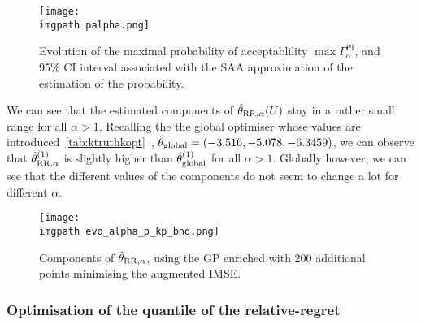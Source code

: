 \documentclass[../../Main_ManuscritThese.tex]{subfiles}
\newcommand\imgpath{/home/victor/acadwriting/Manuscrit/Text/Chapter5/img/}
\begin{document}
\begin{figure}[ht]
  \centering
  \texttt{[image: \\imgpath palpha.png]}
  \caption[Evolution of the maximal probability of
    acceptablility $\max \Gamma_{\alpha}^{\mathrm{PI}}$]{\label{fig:p_alpha} Evolution of the maximal probability of
    acceptablility $\max \Gamma_{\alpha}^{\mathrm{PI}}$, and 95\% CI
    interval associated with the SAA approximation of the estimation
    of the probability.}
\end{figure}

We can see that the estimated components of
$\hat{\theta}_{\mathrm{RR},\alpha}(U)$ stay in a rather small range for
all $\alpha >1$. Recalling the the global optimiser whose values are
introduced~\cref{tab:ktruthkopt}~,
$\hat{\theta}_{\mathrm{global}} = (-3.516, -5.078, -6.3459 )$, we can
observe that $\hat{\theta}^{(1)}_{\mathrm{RR}, \alpha}$ is slightly
higher than $\hat{\theta}^{(1)}_{\mathrm{global}}$ for all $\alpha > 1$.
Globally however, we can see that the different values of the
components do not seem to change a lot for different $\alpha$.


\begin{figure}[ht]
  \centering
  \texttt{[image: \\imgpath evo\_alpha\_p\_kp\_bnd.png]}
  \caption[Components of $\hat{\kk}_{\mathrm{RR},\alpha}$ after
  augmented IMSE reduction]{\label{fig:evo_alphap_kp} Components of
    $\hat{\kk}_{\mathrm{RR},\alpha}$, using the GP enriched with 200
    additional points minimising the augmented IMSE.}
\end{figure}


\clearpage
\subsubsection{Optimisation of the quantile of the relative-regret}
\label{ssec:optim_quantile_rr}
\end{document}
